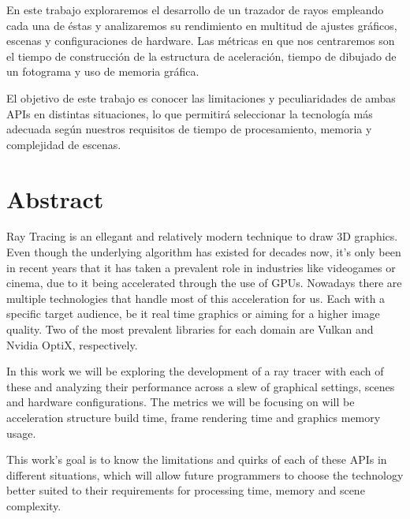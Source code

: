 En este trabajo exploraremos el desarrollo de un trazador de rayos empleando cada una de éstas y analizaremos su rendimiento en multitud de ajustes gráficos, escenas y configuraciones de hardware. Las métricas en que nos centraremos son el tiempo de construcción de la estructura de aceleración, tiempo de dibujado de un fotograma y uso de memoria gráfica.

El objetivo de este trabajo es conocer las limitaciones y peculiaridades de ambas APIs en distintas situaciones, lo que permitirá seleccionar la tecnología más adecuada según nuestros requisitos de tiempo de procesamiento, memoria y complejidad de escenas.

\newpage


\chapter*{Abstract}

Ray Tracing is an ellegant and relatively modern technique to draw 3D graphics. Even though the underlying algorithm has existed for decades now, it's only been in recent years that it has taken a prevalent role in industries like videogames or cinema, due to it being accelerated through the use of GPUs. Nowadays there are multiple technologies that handle most of this acceleration for us. Each with a specific target audience, be it real time graphics or aiming for a higher image quality. Two of the most prevalent libraries for each domain are Vulkan and Nvidia OptiX, respectively. 

In this work we will be exploring the development of a ray tracer with each of these and analyzing their performance across a slew of graphical settings, scenes and hardware configurations. The metrics we will be focusing on will be acceleration structure build time, frame rendering time and graphics memory usage.

This work's goal is to know the limitations and quirks of each of these APIs in different situations, which will allow future programmers to choose the technology better suited to their requirements for processing time, memory and scene complexity.
